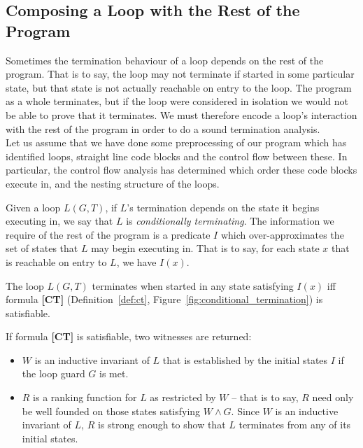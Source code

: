 \documentclass[a4paper]{llncs}
\begin{document}
\subsection{Composing a Loop with the Rest of the Program} \label{sec:env}

Sometimes the termination behaviour of a loop depends on the rest of the program.  That is to say,
the loop may not terminate if started in some particular state, but that state is
not actually reachable on entry to the loop.  The program as a whole
terminates, but if the loop were considered in isolation we would not be able to prove that
it terminates. We must therefore encode a loop's interaction with the rest of the program 
in order to do a sound termination analysis.\\

Let us assume that we have done some preprocessing of our program which has identified
loops, straight line code blocks and the control flow between these.  In particular,
the control flow analysis has determined which order these code blocks execute in,
and the nesting structure of the loops.


Given a loop $L(G,T)$, if $L$'s termination depends on the state it begins
executing in, we say that $L$ is \emph{conditionally terminating}.
The information we require of the rest of the program is a predicate $I$ which
over-approximates the set of states that $L$ may begin executing in.
That is to say, for each state $x$ that is reachable on entry to $L$,
we have $I(x)$.

\begin{theorem}
\label{thm:ct}
 The loop $L(G, T)$ terminates when started in any state satisfying $I(x)$ iff formula {\bf [CT]}
 (Definition~\ref{def:ct}, Figure~\ref{fig:conditional_termination}) is satisfiable.
\end{theorem}
% 

If formula {\bf [CT]} is satisfiable, two witnesses are returned:
\begin{itemize}
\item $W$ is an inductive invariant of $L$ that is established by the initial states $I$ if the loop
guard $G$ is met.
\item $R$ is a ranking function for $L$ as restricted by $W$ -- that is to say, $R$ need only
be well founded on those states satisfying $W \wedge G$.  Since $W$ is an inductive invariant of $L$,
$R$ is strong enough to show that $L$ terminates from any of its initial states.
\end{itemize}
\end{document}
